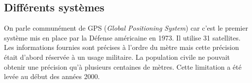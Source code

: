 \documentclass[a4paper,11pt]{article}
\begin{document}
\subsection{Différents systèmes}
On parle communément de GPS (\emph{Global Positioning System}) car c'est le premier système mis en place par la Défense américaine en 1973. Il utilise 31 satellites. Les informations fournies sont précises à l'ordre du mètre mais cette précision était d'abord réservée à un usage militaire. La population civile ne pouvait obtenir une précision qu'à plusieurs centaines de mètres. Cette limitation a été levée au début des années 2000.
\end{document}
